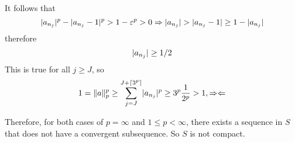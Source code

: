\documentclass[a4paper, 10pt]{article}
\begin{document}
\begin{solution}
    It follows that \begin{equation*}
        \lvert a_{n_j}\rvert^p -  \lvert a_{n_j} - 1\rvert^p > 1 - \varepsilon^p > 0 \Rightarrow \lvert a_{n_j}\rvert > \lvert a_{n_j} - 1\rvert \geq 1 - \lvert a_{n_j}\rvert
    \end{equation*}
    therefore \begin{equation*}
    \lvert a_{n_j}\rvert \geq 1/2
    \end{equation*}
    This is true for all $j \geq J$, so \begin{equation*}
    1 = \lVert a\rVert_p^p \geq \sum_{j = J}^{J + \lceil3^p\rceil} \lvert a_{n_j}\rvert^p \geq 3^p \frac{1}{2^p} > 1, \Rightarrow\Leftarrow
    \end{equation*}

    Therefore, for both cases of $p = \infty$ and $1 \leq p < \infty$, there exists a sequence in $S$ that does not have a convergent subsequence. So $S$ is not compact.
\end{solution}
\end{document}
